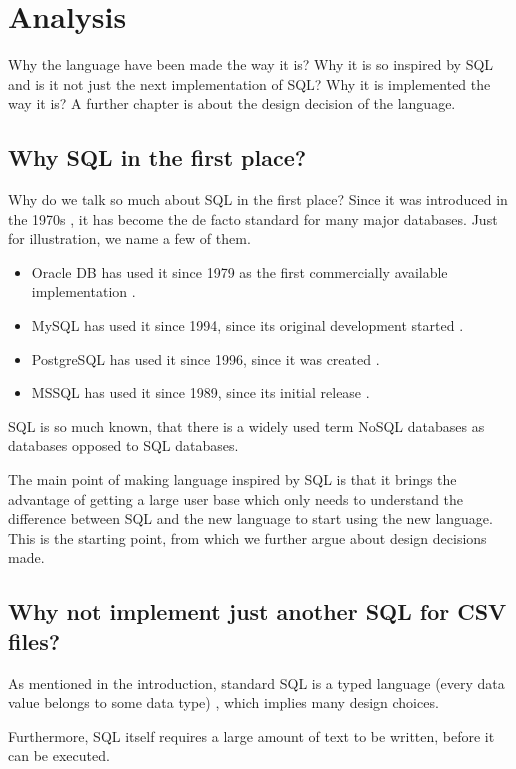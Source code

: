 \chapter{Analysis}
Why the language have been made the way it is? Why it is so inspired by SQL and is it not just the next implementation of SQL?
Why it is implemented the way it is?
A further chapter is about the design decision of the language.


\section{Why SQL in the first place?}
Why do we talk so much about SQL in the first place? Since it was introduced in the 1970s \cite{enwiki-sql}, it has
become the de facto standard for many major databases. Just for illustration, we name a few of them.
\begin{itemize}
    \item Oracle DB has used it since 1979 as the first commercially available implementation \cite{oracle-db-sql}. 
    \item MySQL has used it since 1994, since its original development started \cite{enwiki-mysql}.
    \item PostgreSQL has used it since 1996, since it was created \cite{postgres-birthday}. 
    \item MSSQL has used it since 1989, since its initial release \cite{enwiki-mssql}. 
\end{itemize}

SQL is so much known, that there is a widely used term NoSQL databases as databases opposed to SQL databases.

The main point of making language inspired by SQL is that it brings the advantage of getting a large user base which only needs to understand the difference between SQL and the new language to start using the new language. This is the starting point, from which we further argue about design decisions made.


\section{Why not implement just another SQL for CSV files?}
As mentioned in the introduction, standard SQL is a typed language (every data value belongs to some data type) \cite{ISO9075-2023}, 
which implies many design choices. 

Furthermore, SQL itself requires a large amount of text to be written,
before it can be executed. 

